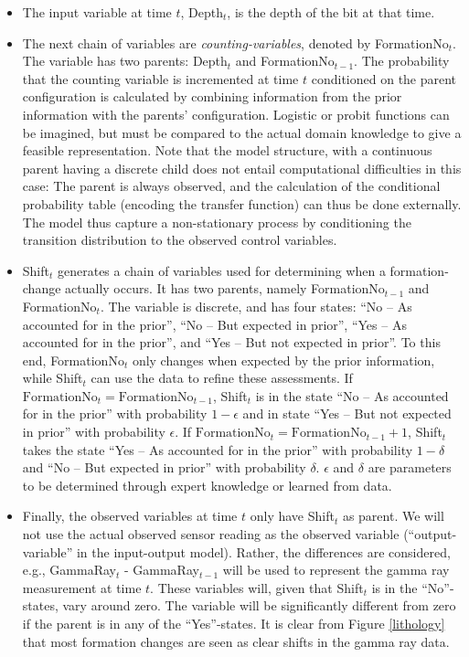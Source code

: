 \begin{itemize}

\item The input variable at time $t$, Depth$_t$, is the depth of the bit at that time.

\item The next chain of variables are \textit{counting-variables}, denoted by  FormationNo$_t$. The variable has two parents: Depth$_t$ and FormationNo$_{t-1}$. 
The probability that the counting variable is incremented at time $t$ conditioned on the parent configuration is calculated by combining information from the prior information with the parents' configuration. Logistic or probit functions can  be imagined, but must be compared to the actual domain knowledge to give a feasible representation.
Note that the model structure, with  a continuous parent having a discrete child does not entail computational difficulties in this case: The parent is always observed, and the calculation of the conditional probability table (encoding the transfer function) can thus be done externally. The model thus capture a non-stationary process by conditioning the transition distribution to the observed control variables. 

\item Shift$_t$  generates a  chain of variables used for determining when   a formation-change actually occurs. It has two parents, namely  FormationNo$_{t-1}$ and  FormationNo$_t$. 
The variable is discrete, and has four states: ``No -- As accounted for in the prior'', ``No -- But expected in prior'', ``Yes -- As accounted for in the prior'', and ``Yes -- But not expected in prior''. 
To this end, FormationNo$_t$ only changes when expected by the prior information, while Shift$_t$ can use the data to refine these assessments. If $\mbox{FormationNo}_{t}= \mbox{FormationNo}_{t-1}$, Shift$_t$ is in the state 
 ``No -- As accounted for in the prior'' with probability $1-\epsilon$ and in state ``Yes -- But not expected in prior'' with probability $\epsilon$. If $\mbox{FormationNo}_{ t}=\mbox{FormationNo}_{t-1}+1$, Shift$_t$ takes the state 
``Yes -- As accounted for in the prior'' with probability $1-\delta$ and ``No -- But expected in prior'' with probability $\delta$. $\epsilon$ and $\delta$ are parameters to be determined through expert knowledge or learned from data.

\item Finally, the observed variables at time $t$ only have  Shift$_t$ as parent. We will not use the actual observed sensor reading as the observed variable (``output-variable'' in the input-output model). Rather, the differences are considered, e.g., GammaRay$_t$ - GammaRay$_{t-1}$ will be used to represent the gamma ray measurement at time $t$. These variables will, given that Shift$_t$ is in the ``No''-states, vary around zero. The variable will be significantly different from zero if the parent is in any of the ``Yes''-states.  It is clear from Figure \ref{lithology} that most formation changes are seen as clear shifts in the gamma ray data.
\end{itemize}

